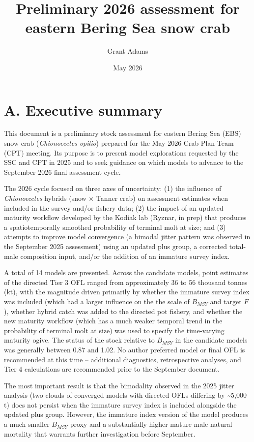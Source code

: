 \documentclass[
]{article}
\title{Preliminary 2026 assessment for eastern Bering Sea snow crab}
\author{Grant Adams}
\date{May 2026}
\begin{document}
\maketitle

{
\setcounter{tocdepth}{2}
\tableofcontents
}
\section{A. Executive summary}\label{a.-executive-summary}

This document is a preliminary stock assessment for eastern Bering Sea (EBS) snow crab (\emph{Chionoecetes opilio}) prepared for the May 2026 Crab Plan Team (CPT) meeting. Its purpose is to present model explorations requested by the SSC and CPT in 2025 and to seek guidance on which models to advance to the September 2026 final assessment cycle.

The 2026 cycle focused on three axes of uncertainty: (1) the influence of \emph{Chionoecetes} hybrids (snow \(\times\) Tanner crab) on assessment estimates when included in the survey and/or fishery data; (2) the impact of an updated maturity workflow developed by the Kodiak lab (Ryznar, in prep) that produces a spatiotemporally smoothed probability of terminal molt at size; and (3) attempts to improve model convergence (a bimodal jitter pattern was observed in the September 2025 assessment) using an updated plus group, a corrected total-male composition input, and/or the addition of an immature survey index.

A total of 14 models are presented. Across the candidate models, point estimates of the directed Tier 3 OFL ranged from approximately 36 to 56 thousand tonnes (kt), with the magnitude driven primarily by whether the immature survey index was included (which had a larger influence on the the scale of \(B_{MSY}\) and target \(F\)), whether hybrid catch was added to the directed pot fishery, and whether the new maturity workflow (which has a much weaker temporal trend in the probability of terminal molt at size) was used to specify the time-varying maturity ogive. The status of the stock relative to \(B_{MSY}\) in the candidate models was generally between 0.87 and 1.02. No author preferred model or final OFL is recommended at this time -- additional diagnostics, retrospective analyses, and Tier 4 calculations are recommended prior to the September document.

The most important result is that the bimodality observed in the 2025 jitter analysis (two clouds of converged models with directed OFLs differing by \textasciitilde5,000 t) does not persist when the immature survey index is included alongside the updated plus group. However, the immature index version of the model produces a much smaller \(B_{MSY}\) proxy and a substantially higher mature male natural mortality that warrants further investigation before September.
\end{document}
